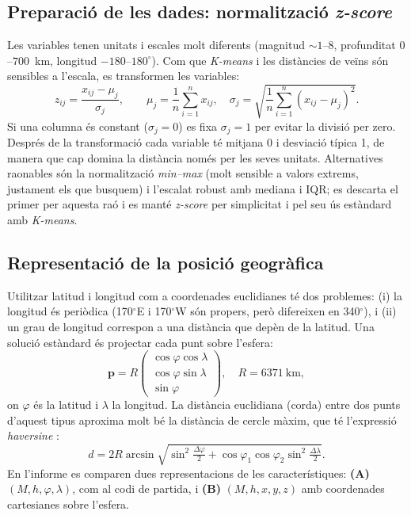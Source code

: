 \documentclass[11pt,a4paper]{article}
\begin{document}
\subsection{Preparació de les dades: normalització \textit{z-score}}
Les variables tenen unitats i escales molt diferents (magnitud $\sim 1$--$8$,
profunditat $0$--$700$~km, longitud $-180$--$180^\circ$). Com que
\textit{K-means} i les distàncies de veïns són sensibles a l'escala, es
transformen les variables:
\begin{equation}
  z_{ij} = \frac{x_{ij}-\mu_j}{\sigma_j},\qquad
  \mu_j=\frac1n\sum_{i=1}^n x_{ij},\quad
  \sigma_j=\sqrt{\frac1n\sum_{i=1}^n (x_{ij}-\mu_j)^2}.
\end{equation}
Si una columna és constant ($\sigma_j=0$) es fixa $\sigma_j=1$ per evitar la
divisió per zero. Després de la transformació cada variable té mitjana 0 i
desviació típica 1, de manera que cap domina la distància només per les seves
unitats. Alternatives raonables són la normalització \textit{min--max}
(molt sensible a valors extrems, justament els que busquem) i l'escalat robust
amb mediana i IQR; es descarta el primer per aquesta raó i es manté
\textit{z-score} per simplicitat i pel seu ús estàndard amb \textit{K-means}.

\subsection{Representació de la posició geogràfica}\label{sec:geo}
Utilitzar latitud i longitud com a coordenades euclidianes té dos problemes:
(i) la longitud és periòdica (170$^\circ$E i 170$^\circ$W són propers, però
difereixen en 340$^\circ$), i (ii) un grau de longitud correspon a una
distància que depèn de la latitud. Una solució estàndard és projectar cada
punt sobre l'esfera:
\begin{equation}
  \mathbf{p}=R\begin{pmatrix}\cos\varphi\cos\lambda\\ \cos\varphi\sin\lambda\\ \sin\varphi\end{pmatrix},\quad R=6371~\text{km},
\end{equation}
on $\varphi$ és la latitud i $\lambda$ la longitud. La distància euclidiana
(corda) entre dos punts d'aquest tipus aproxima molt bé la distància de
cercle màxim, que té l'expressió \emph{haversine} \cite{sinnott1984}:
\begin{equation}
  d = 2R\arcsin\sqrt{\sin^2\!\tfrac{\Delta\varphi}{2}
      +\cos\varphi_1\cos\varphi_2\sin^2\!\tfrac{\Delta\lambda}{2}}.
\end{equation}
En l'informe es comparen dues representacions de les característiques:
\textbf{(A)} $(M,h,\varphi,\lambda)$, com al codi de partida, i
\textbf{(B)} $(M,h,x,y,z)$ amb coordenades cartesianes sobre l'esfera.
\end{document}
